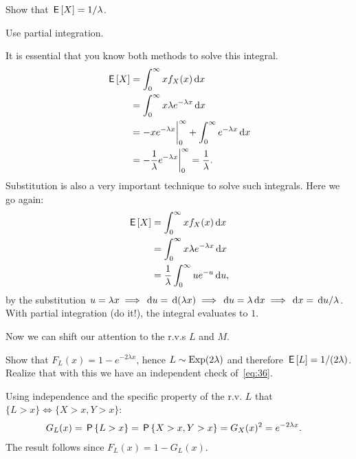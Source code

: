 \documentclass[a4paper,11pt]{article}
\begin{document}
\begin{exercise}\label{ex:4}
Show that $\,\mathsf{E}\left[X\right] = 1/\lambda$.
\begin{hint}
  Use partial integration.
\end{hint}
\begin{solution}
It is essential that  you know both methods to solve this integral.
  \begin{align}
\,\mathsf{E}\left[X\right] 
&= \int_{0}^{\infty}  x f_{X}(x) \,\textrm{d}x  \\
&= \int_{0}^{\infty}  x \lambda e^{-\lambda x} \,\textrm{d}x  \\
&= - xe^{-\lambda x} \biggr|_{0}^{\infty} + \int_{0}^{\infty}  e^{-\lambda x} \,\textrm{d}x  \\
&=  - \frac 1 \lambda e^{-\lambda x} \biggr|_{0}^{\infty} = \frac 1 \lambda.
  \end{align}
Substitution is also a very important technique to solve such integrals. Here we go again:
  \begin{align}
\,\mathsf{E}\left[X\right] 
&= \int_{0}^{\infty}  x f_{X}(x) \,\textrm{d}x  \\
&= \int_{0}^{\infty}  x \lambda e^{-\lambda x} \,\textrm{d}x  \\
&= \frac 1 \lambda \int_{0}^{\infty}  u  e^{- u} \,\textrm{d}u, 
  \end{align}
  by the substitution $u=\lambda x \implies \,\textrm{d}u = \,\textrm{d}(\lambda x) \implies \,\textrm{d}u = \lambda \,\textrm{d}x \implies \,\textrm{d}x = \,\textrm{d}u / \lambda$.
  With partial integration (do it!), the integral evaluates to $1$.
\end{solution}
\end{exercise}


Now we can shift our attention to the r.v.s $L$ and $M$.


\begin{exercise}
  Show that $F_L(x) = 1-e^{-2\lambda x}$, hence  $L\sim \mathrm{Exp}(2\lambda)$ and therefore $\,\mathsf{E}\left[L\right] = 1/(2\lambda)$.
  Realize that with this we have an independent check of~\cref{eq:36}.
\begin{solution}
Using independence and the specific property of the r.v. $L$ that $\{L>x\} \iff \{X>x, Y>x\}$:
 \begin{align}
    \label{eq:22}
G_L(x) = \P{L>x}  &= \P{X>x, Y> x} = G_X(x)^{2} = e^{-2\lambda x}.
  \end{align}
The result follows since  $F_{L}(x) = 1-G_{L}(x)$.
\end{solution}
\end{exercise}
\end{document}

